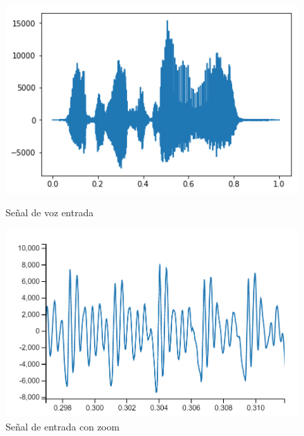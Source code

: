 \documentclass[assd_tp2_main.tex]{subfiles}
\begin{document}
\begin{figure}[H]
\centering
  \begin{minipage}{0.4\textwidth}
    \centering
    \includegraphics[width=1\textwidth]{graficos/EJ6/in.png}
    \caption{Señal de voz entrada}
    \label{fig:uno}
  \end{minipage}%
  \hspace{5mm}
  \begin{minipage}{0.4\textwidth}
    \centering
    \includegraphics[width=1\textwidth]{graficos/EJ6/inzoom.png}
    \caption{Señal de entrada con zoom}
    \label{fig:dos}
  \end{minipage}
\end{figure}
\end{document}
